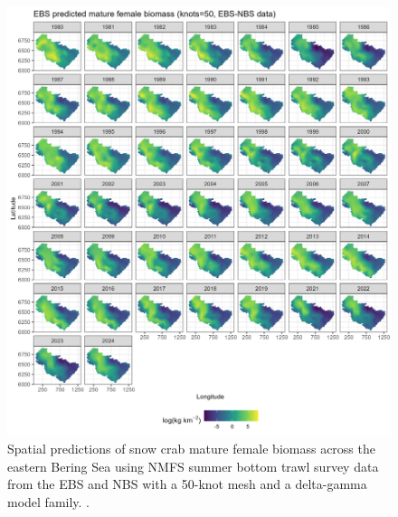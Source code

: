 \documentclass[
]{article}
\begin{document}
\begin{figure}

{\centering \includegraphics[width=1\linewidth,height=1\textheight]{../SNOW/Figures/EBSNBS-50-DG-matfem_spatbio} 

}

\caption{Spatial predictions of snow crab mature female biomass across the eastern Bering Sea using NMFS summer bottom trawl survey data from the EBS and NBS with a 50-knot mesh and a delta-gamma model family. .}\label{fig:snow-spatpred-bio-50-matfem-EBSNBS}
\end{figure}
\end{document}
